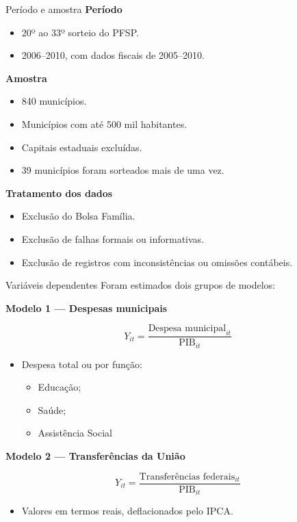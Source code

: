 \documentclass[
  10pt,
  ignorenonframetext,
  aspectratio=169,
  brazilian,
]{beamer}
\providecommand{\tightlist}{%
  \setlength{\itemsep}{0pt}\setlength{\parskip}{0pt}}
\begin{document}
\begin{frame}{Período e amostra}
\protect{}\label{peruxedodo-e-amostra}
\textbf{Período}

\begin{itemize}
\tightlist
\item
  20º ao 33º sorteio do PFSP.
\item
  2006--2010, com dados fiscais de 2005--2010.
\end{itemize}

\textbf{Amostra}

\begin{itemize}
\tightlist
\item
  840 municípios.
\item
  Municípios com até 500 mil habitantes.
\item
  Capitais estaduais excluídas.
\item
  39 municípios foram sorteados mais de uma vez.
\end{itemize}

\textbf{Tratamento dos dados}

\begin{itemize}
\tightlist
\item
  Exclusão do Bolsa Família.
\item
  Exclusão de falhas formais ou informativas.
\item
  Exclusão de registros com inconsistências ou omissões contábeis.
\end{itemize}
\end{frame}

\begin{frame}{Variáveis dependentes}
\protect{}\label{variuxe1veis-dependentes}
Foram estimados dois grupos de modelos:

\textbf{Modelo 1 --- Despesas municipais}

\[
Y_{it}=\frac{\text{Despesa municipal}_{it}}{\text{PIB}_{it}}
\]

\begin{itemize}
\tightlist
\item
  Despesa total ou por função:

  \begin{itemize}
  \tightlist
  \item
    Educação;
  \item
    Saúde;
  \item
    Assistência Social
  \end{itemize}
\end{itemize}

\textbf{Modelo 2 --- Transferências da União}

\[
Y_{it}=\frac{\text{Transferências federais}_{it}}{\text{PIB}_{it}}
\]

\begin{itemize}
\tightlist
\item
  Valores em termos reais, deflacionados pelo IPCA.
\end{itemize}
\end{frame}
\end{document}
